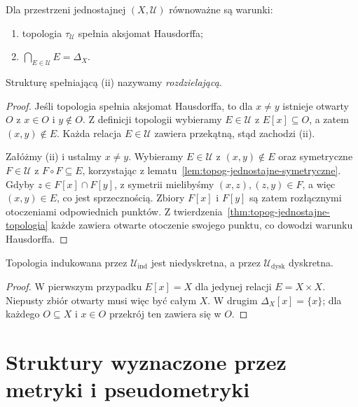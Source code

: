 \begin{twierdzenie}
\label{thm:topog-jednostajne-hausdorff}
Dla przestrzeni jednostajnej $(X,\mathcal U)$
równoważne są warunki:
\begin{enumerate}[label=(\roman*)]
\item topologia $\tau_{\mathcal U}$ spełnia aksjomat Hausdorffa;
\item $\bigcap_{E\in\mathcal U}E=\Delta_X$.
\end{enumerate}
Strukturę spełniającą (ii) nazywamy \emph{rozdzielającą}.
\end{twierdzenie}
\begin{proof}
Jeśli topologia spełnia aksjomat Hausdorffa,
to dla $x\ne y$ istnieje otwarty $O$ z
$x\in O$ i $y\notin O$. Z definicji
topologii wybieramy $E\in\mathcal U$ z
$E[x]\subseteq O$, a zatem $(x,y)\notin E$.
Każda relacja $E\in\mathcal U$ zawiera przekątną,
stąd zachodzi (ii).

Załóżmy (ii) i ustalmy $x\ne y$. Wybieramy
$E\in\mathcal U$ z $(x,y)\notin E$ oraz
symetryczne $F\in\mathcal U$ z
$F\circ F\subseteq E$,
korzystając z lematu~\ref{lem:topog-jednostajne-symetryczne}.
Gdyby $z\in F[x]\cap F[y]$, z symetrii mielibyśmy
$(x,z),(z,y)\in F$, a więc $(x,y)\in E$,
co jest sprzecznością. Zbiory $F[x]$ i $F[y]$
są zatem rozłącznymi otoczeniami odpowiednich punktów.
Z twierdzenia~\ref{thm:topog-jednostajne-topologia}
każde zawiera otwarte otoczenie swojego punktu,
co dowodzi warunku Hausdorffa.
\end{proof}

\begin{wniosek}
\label{cor:topog-jednostajne-skrajne-topologie}
Topologia indukowana przez $\mathcal U_{\mathrm{ind}}$
jest niedyskretna, a przez $\mathcal U_{\mathrm{dysk}}$
dyskretna.
\end{wniosek}
\begin{proof}
W pierwszym przypadku $E[x]=X$ dla jedynej
relacji $E=X\times X$. Niepusty zbiór otwarty
musi więc być całym $X$. W drugim
$\Delta_X[x]=\{x\}$; dla każdego $O\subseteq X$
i $x\in O$ przekrój ten zawiera się w $O$.
\end{proof}

\section{Struktury wyznaczone przez metryki i pseudometryki}
\label{sec:topog-jednostajne-metryczne}

